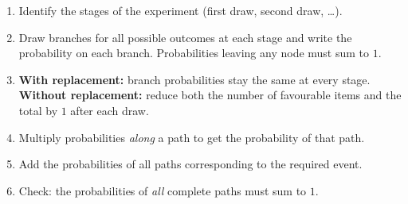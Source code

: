 \documentclass[11pt]{article}
\newcommand{\cle}[1]{{\popxbold\color{popdark}#1}}
\begin{document}
\begin{methode}
\begin{enumerate}
\item Identify the \cle{stages} of the experiment (first draw, second draw, \dots).
\item Draw branches for all possible outcomes at each stage and write the probability on each branch. Probabilities leaving any node must sum to $1$.
\item \textbf{With replacement:} branch probabilities stay the same at every stage. \textbf{Without replacement:} reduce both the number of favourable items and the total by $1$ after each draw.
\item Multiply probabilities \emph{along} a path to get the probability of that path.
\item Add the probabilities of all paths corresponding to the required event.
\item Check: the probabilities of \emph{all} complete paths must sum to $1$.
\end{enumerate}
\end{methode}
\end{document}
